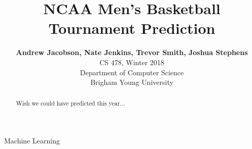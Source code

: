 \documentclass[conference]{IEEEtran}
\begin{document}
\title{NCAA Men's Basketball Tournament Prediction}

\author{
  \textbf{Andrew Jacobson, Nate Jenkins, Trevor Smith, Joshua Stephens}\\
  CS 478, Winter 2018\\
  Department of Computer Science\\
  Brigham Young University\\
}
\maketitle

\thispagestyle{plain}
\pagestyle{plain}


\begin{abstract}
Wish we could have predicted this year...
\end{abstract}

\begin{IEEEkeywords}
Machine Learning
\end{IEEEkeywords}













\end{document}
